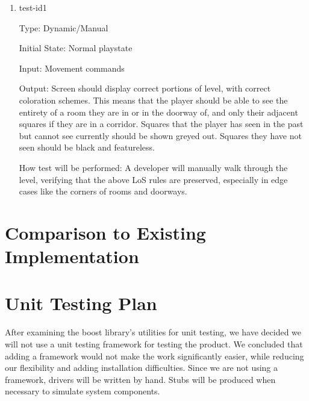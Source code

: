 \documentclass[12pt, titlepage]{article}
\begin{document}
		\begin{enumerate}

		\item{test-id1\\}

		Type: Dynamic/Manual

		Initial State: Normal playstate

		Input: Movement commands

		Output: Screen should display correct portions of level, with correct coloration schemes. This means that the player should be able to see the entirety of a room they are in or in the doorway of, and only their adjacent squares if they are in a corridor. Squares that the player has seen in the past but cannot see currently should be shown greyed out. Squares they have not seen should be black and featureless.

		How test will be performed: A developer will manually walk through the level, verifying that the above LoS rules are preserved, especially in edge cases like the corners of rooms and doorways.

		\end{enumerate} 

\newpage
\section{Comparison to Existing Implementation}	
\label{section5}
	
\newpage
\section{Unit Testing Plan}
\label{section6}
	
	After examining the boost library's utilities for unit testing, we have decided we will not use a unit testing framework for testing the product. We concluded that adding a framework would not make the work significantly easier, while reducing our flexibility and adding installation difficulties. Since we are not using a framework, drivers will be written by hand. Stubs will be produced when necessary to simulate system components.
	
\end{document}
